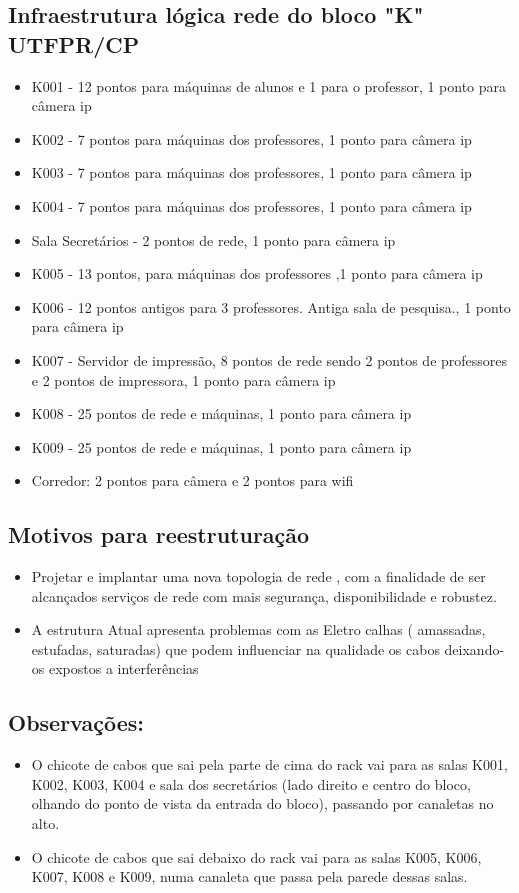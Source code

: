 \documentclass[	DIV=calc,%
							paper=a4,%
							fontsize=12pt,%
							onecolumn]{scrartcl}	 					%
\begin{document}
\subsection{Infraestrutura lógica rede do bloco "K" UTFPR/CP}
\begin{itemize}
	\item K001 - 12 pontos para máquinas de alunos e 1 para o professor, 1 ponto para câmera ip
	\item K002 - 7 pontos para máquinas dos professores, 1 ponto para câmera ip
	\item K003 - 7 pontos para máquinas dos professores, 1 ponto para câmera ip
	\item K004 - 7 pontos para máquinas dos professores, 1 ponto para câmera ip
	\item Sala Secretários - 2 pontos de rede, 1 ponto para câmera ip
	\item K005 - 13 pontos, para máquinas dos professores ,1 ponto para câmera ip
	\item K006 - 12 pontos antigos para 3 professores. Antiga sala de pesquisa., 1 ponto para câmera ip
	\item K007 - Servidor de impressão, 8 pontos de rede sendo 2 pontos de professores e 2 pontos de impressora, 1 ponto para câmera ip
	\item K008 - 25 pontos de rede e máquinas, 1 ponto para câmera ip
	\item K009 - 25 pontos de rede e máquinas, 1 ponto para câmera ip
	\item Corredor: 2 pontos para câmera e 2 pontos para wifi
\end{itemize}
\subsection{Motivos para reestruturação}
\begin{itemize}
	\item Projetar e implantar uma nova topologia de rede , com a finalidade de ser alcançados serviços de rede com mais segurança, disponibilidade e robustez.
	\item A estrutura Atual apresenta problemas com as Eletro calhas ( amassadas, estufadas, saturadas) que podem influenciar na qualidade os cabos deixando-os expostos a interferências
\end{itemize}
\subsection{Observações:}
\begin{itemize}
	\item O chicote de cabos que sai pela parte de cima do rack vai para as salas K001, K002, K003, K004 e sala dos secretários (lado direito e centro do bloco, olhando do ponto de vista da entrada do bloco), passando por canaletas no alto. 
	\item O chicote de cabos que sai debaixo do rack vai para as salas K005, K006, K007, K008 e K009, numa canaleta que passa pela parede dessas salas.
\end{itemize}
 	
\end{document}
